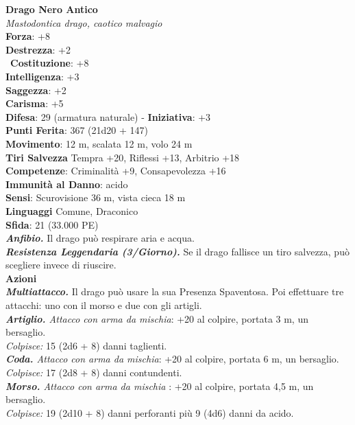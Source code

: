 \begin{multicols}{2}
\medskip\textbf{Drago Nero Antico}\\
\emph{Mastodontica drago, caotico malvagio}\\
\textbf{Forza}: +8\\
\textbf{Destrezza}: +2\\\
\textbf{Costituzione}: +8\\
\textbf{Intelligenza}: +3\\
\textbf{Saggezza}: +2\\
\textbf{Carisma}: +5\\
\textbf{Difesa}: 29 (armatura naturale) - \textbf{Iniziativa}: +3\\
\textbf{Punti Ferita}: 367 (21d20 + 147)\\
\textbf{Movimento}: 12 m, scalata 12 m, volo 24 m\\
\textbf{Tiri Salvezza} Tempra +20, Riflessi +13, Arbitrio +18\\
\textbf{Competenze}: Criminalità +9, Consapevolezza +16\\
\textbf{Immunità al Danno}: acido\\
\textbf{Sensi}: Scurovisione 36 m, vista cieca 18 m\\
\textbf{Linguaggi} Comune, Draconico\\
\textbf{Sfida}: 21 (33.000 PE)\smallskip\\
\emph{\textbf{Anfibio.}} Il drago può respirare aria e acqua.\\
\emph{\textbf{Resistenza Leggendaria (3/Giorno).}} Se il drago fallisce un tiro salvezza, può scegliere invece di riuscire.\\
\smallskip\textbf{Azioni}\\
\emph{\textbf{Multiattacco.}} Il drago può usare la sua Presenza Spaventosa. Poi effettuare tre attacchi: uno con il morso e due con gli artigli.\\
\emph{\textbf{Artiglio.} Attacco con arma da mischia}: +20 al colpire, portata 3 m, un bersaglio.\\
\emph{Colpisce:} 15 (2d6 + 8) danni taglienti.\\
\emph{\textbf{Coda.} Attacco con arma da mischia}: +20 al colpire, portata 6 m, un bersaglio.\\
\emph{Colpisce:} 17 (2d8 + 8) danni contundenti.\\
\emph{\textbf{Morso.} Attacco con arma da mischia} : +20 al colpire, portata 4,5 m, un bersaglio.\\
\emph{Colpisce:} 19 (2d10 + 8) danni perforanti più 9 (4d6) danni da acido.\\

\end{multicols}
